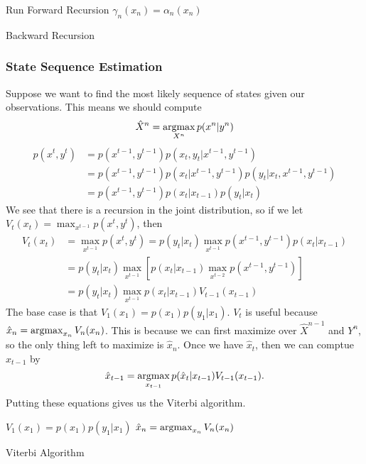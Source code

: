 \begin{algorithm}[H]
	\SetAlgoLined
	Run Forward Recursion\;
	$\gamma_n(x_n) = \alpha_n(x_n)$\;
	\caption{Backward Recursion}
\end{algorithm}
\subsubsection{State Sequence Estimation}
Suppose we want to find the most likely sequence of states given our observations.
This means we should compute \[
	\hat{X}^n = \operatorname*{argmax}_{X^n}p(x^n|y^n)
\]
\begin{align*}
	p(x^t, y^t) &= p(x^{t-1}, y^{t-1})p(x_t, y_t|x^{t-1},y^{t-1})\\
	&= p(x^{t-1}, y^{t-1})p(x_t|x^{t-1},y^{t-1})p(y_t|x_t,x^{t-1},y^{t-1}) \\
	&= p(x^{t-1},y^{t-1})p(x_t|x_{t-1})p(y_t|x_t)
\end{align*}
We see that there is a recursion in the joint distribution, so if we let $V_t(x_t) = \max_{x^{t-1}}p(x^t,y^t)$, then
\begin{align*}
	V_t(x_t) &= \max_{x^{t-1}} p(x^t, y^t) = p(y_t|x_t)\max_{x^{t-1}}p(x^{t-1},y^{t-1})p(x_t|x_{t-1})\\
	&= p(y_t|x_t)\max_{x^{t-1}}\left[p(x_t|x_{t-1}) \max_{x^{t-2}} p(x^{t-1},y^{t-1})\right]\\
	&= p(y_t|x_t)\max_{x^{t-1}}p(x_t|x_{t-1}) V_{t-1}(x_{t-1})
\end{align*}
The base case is that $V_1(x_1) = p(x_1)p(y_1|x_1)$.
$V_t$ is useful because $\hat{x}_n = \operatorname*{argmax}_{x_n}V_n(x_n)$.
This is because we can first maximize over $\hat{X}^{n-1}$ and $Y^n$, so the only thing left to maximize is $\hat{x}_n$.
Once we have $\hat{x}_t$, then we can comptue $\hat{x}_{t-1}$ by \[
	\hat{x}_{t-1} = \operatorname*{argmax}_{x_{t-1}}p(\hat{x}_t|x_{t-1})V_{t-1}(x_{t-1}).
\]
Putting these equations gives us the Viterbi algorithm.

\begin{algorithm}[H]
	\SetAlgoLined
	$V_1(x_1) = p(x_1)p(y_1|x_1)$\;
	$\hat{x}_n = \operatorname*{argmax}_{x_n} V_n(x_n)$\;
	\caption{Viterbi Algorithm}
\end{algorithm}


